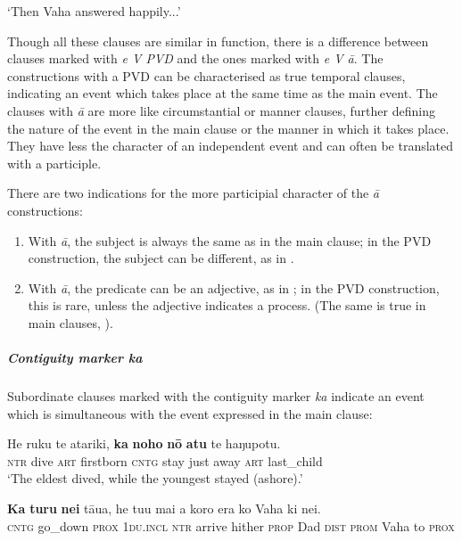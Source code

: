 \glt
‘Then Vaha answered happily...’ \textstyleExampleref{[R304.098]} 
\z

Though all these clauses are similar in function, there is a difference between clauses marked with \textit{e V PVD} and the ones marked with \textit{e V {\ꞌ}ā}. The constructions with a PVD can be characterised as true temporal clauses, indicating an event which takes place at the same time as the main event. The clauses with \textit{{\ꞌ}ā} are more like circumstantial or manner clauses, further defining the nature of the event in the main clause or the manner in which it takes place. They have less the character of an independent event and can often be translated with a participle.

There are two indications for the more participial character of the \textit{{\ꞌ}ā} constructions:

\begin{enumerate}
\item 
With \textit{{\ꞌ}ā}, the subject is always the same as in the main clause; in the PVD construction, the subject can be different, as in .

\item 
With \textit{{\ꞌ}ā}, the predicate can be an adjective, as in ; in the PVD construction, this is rare, unless the adjective indicates a process. (The same is true in main clauses, ).

\end{enumerate}

\subparagraph{Contiguity marker \textit{ka}} Subordinate clauses marked with the contiguity marker \textit{ka} indicate an event which is simultaneous with the event expressed in the main clause: 

\ea\label{ex:11.228}
\gll He ruku te {\ꞌ}atariki, \textbf{ka} \textbf{noho} \textbf{nō} \textbf{atu} te haŋupotu. \\
\textsc{ntr} dive \textsc{art} firstborn \textsc{cntg} stay just away \textsc{art} last\_child \\

\glt 
‘The eldest dived, while the youngest stayed (ashore).’ \textstyleExampleref{[Mtx-7-30.012]}
\z

\ea\label{ex:11.229}
\gll \textbf{Ka} \textbf{turu} \textbf{nei} tāua, he tu{\ꞌ}u mai a koro era ko Vaha ki nei. \\
\textsc{cntg} go\_down \textsc{prox} \textsc{1du.incl} \textsc{ntr} arrive hither \textsc{prop} Dad \textsc{dist} \textsc{prom} Vaha to \textsc{prox} \\

